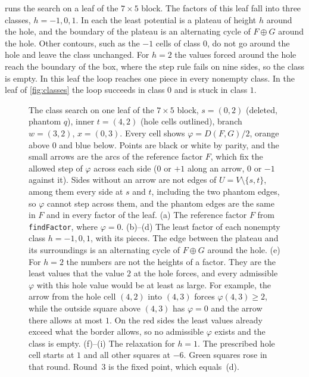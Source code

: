 \documentclass[11pt]{article}
\theoremstyle{plain}
\theoremstyle{definition}
\theoremstyle{remark}
\newcommand{\lean}[1]{\texttt{#1}}
\begin{document}
 runs the search on a leaf of the $7\times5$ block.
The factors of this leaf fall into three classes, $h=-1,0,1$.
In each the least potential is a plateau of height $h$ around the hole, and the boundary of the
plateau is an alternating cycle of $F\oplus G$ around the hole.
Other contours, such as the $-1$ cells of class $0$, do not go around the hole and leave the class
unchanged.
For $h=2$ the values forced around the hole reach the boundary of the box, where the step rule fails
on nine sides, so the class is empty.
In this leaf the loop reaches one piece in every nonempty class.
In the leaf of \cref{fig:classes} the loop succeeds in class $0$ and is stuck in class $1$.

\begin{figure}[p]
\centering

\caption{The class search on one leaf of the $7\times5$ block, $s=(0,2)$ (deleted, phantom $q$),
inner $t=(4,2)$ (hole cells outlined), branch $w=(3,2)$, $x=(0,3)$.
Every cell shows $\varphi=D(F,G)/2$, orange above $0$ and blue below.
Points are black or white by parity, and the small arrows are the arcs of the reference factor $F$,
which fix the allowed step of $\varphi$ across each side ($0$ or $+1$ along an arrow, $0$ or $-1$
against it).
Sides without an arrow are not edges of $U=V\setminus\{s,t\}$, among them every side at $s$ and
$t$, including the two phantom edges, so $\varphi$ cannot step across them, and the phantom edges
are the same in $F$ and in every factor of the leaf.
(a) The reference factor $F$ from \lean{findFactor}, where $\varphi=0$.
(b)--(d) The least factor of each nonempty class $h=-1,0,1$, with its pieces.
The edge between the plateau and its surroundings is an alternating cycle of $F\oplus G$ around
the hole.
(e) For $h=2$ the numbers are not the heights of a factor.
They are the least values that the value $2$ at the hole forces, and every admissible $\varphi$
with this hole value would be at least as large.
For example, the arrow from the hole cell $(4,2)$ into $(4,3)$ forces $\varphi(4,3)\ge2$, while the
outside square above $(4,3)$ has $\varphi=0$ and the arrow there allows at most $1$.
On the red sides the least values already exceed what the border allows, so no admissible $\varphi$
exists and the class is empty.
(f)--(i) The relaxation for $h=1$.
The prescribed hole cell starts at $1$ and all other squares at $-6$.
Green squares rose in that round.
Round~$3$ is the fixed point, which equals~(d).}
\label{fig:classsearch}
\end{figure}
\end{document}
